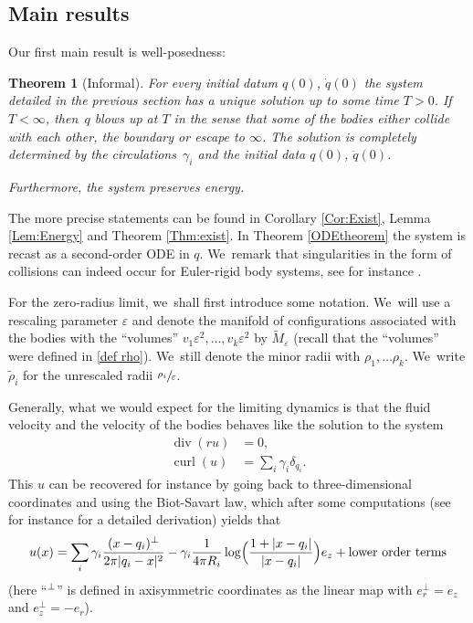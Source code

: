 \documentclass[JEP,XML,SOM,Unicode,published]{cedram}
\let\epsilon\varepsilon
\newtheorem{theorem}{Theorem}[subsection]
\theoremstyle{definition}
\renewcommand{\div}{\operatorname{div}}
\DeclareMathOperator{\curl}{curl}
\let\eps\epsilon
\begin{document}
\subsection{Main results}\label{Main results}

Our first main result is well-posedness: \begin{theorem}[Informal]
For every initial datum $q(0)$, $\dot{q}(0)$ the system detailed in the previous section has a unique solution up to some time $T>0$.
If $T<\infty$, then~$q$ blows up at $T$ in the sense that some of the bodies either collide with each other, the boundary or escape to $\infty$. The solution is completely determined by the circulations~$\gamma_i$ and the initial data $q(0)$, $\dot{q}(0)$.

Furthermore, the system preserves energy.
\end{theorem}

The more precise statements can be found in Corollary \ref{Cor:Exist}, Lemma \ref{Lem:Energy} and Theorem \ref{Thm:exist}.
In Theorem \ref{ODEtheorem} the system is recast as a second-order ODE in $q$. We~remark that singularities in the form of collisions can indeed occur for
Euler-rigid body systems, see for instance \cite{HouotMunnier4}.

For the zero-radius limit, we~shall first introduce some notation. We~will use a rescaling parameter $\eps$ and denote the manifold of configurations associated with the bodies with the ``volumes'' $v_1\eps^2,\dots, v_k\eps^2$ by $\tilde{M}_\eps$ (recall that the ``volumes'' were defined in \eqref{def rho}). We~still denote the minor radii with $\rho_1,\dots\rho_k$. We~write $\tilde{\rho}_i$ for the unrescaled radii $\sfrac{\rho_i}{\eps}$.

Generally, what we would expect for the limiting dynamics is that the fluid velocity and the velocity of the bodies behaves like the solution to the system
\begin{align*}
\div(ru)&=0,\\
\curl(u)&=\sum_i\gamma_i\delta_{q_i}.
\end{align*}
This $u$ can be recovered for instance by going back to three-dimensional coordinates and using the Biot-Savart law, which after some computations (see for instance \hbox{\cite[Lem.\,4]{ButtaMarchioro}} for a detailed derivation) yields that
\begin{equation}\label{asymptotic velocity}
u(x)=\sum_i\gamma_i\frac{(x-q_i)^\perp}{2\pi|q_i-x|^2}-\gamma_i\frac{1}{4\pi R_i}\log\Bigl(\frac{1+|x-q_i|}{|x-q_i|}\Bigr)e_z+\text{lower order terms}
\end{equation}
(here ``$\vphantom{a}^\perp$'' is defined in axisymmetric coordinates as the linear map with $e_r^\perp=e_z$ and $e_z^\perp=-e_r$).
\end{document}
